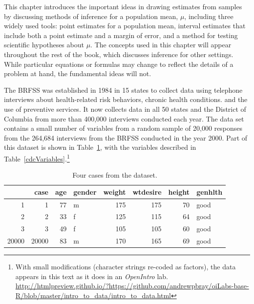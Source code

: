 This chapter introduces the important ideas in drawing estimates from samples by discussing methods of inference for a population mean, $\mu$, including three widely used tools: point estimates for a population mean, interval estimates that include both a point estimate and a margin of error, and a method for testing scientific hypotheses about $\mu$. The concepts used in this chapter will appear throughout the rest of the book, which discusses inference for other settings. While particular equations or formulas may change to reflect the details of a problem at hand, the fundamental ideas will not. 



The BRFSS was established in 1984 in 15 states to collect data using telephone interviews about health-related risk behaviors, chronic health conditions. and the use of preventive services.  It now collects data in all 50 states and the District of Columbia from more than 400,000 interviews conducted each year.  The data set  contains a small number of variables from a random sample of 20,000 responses from the 264,684 interviews from the BRFSS conducted in the year 2000.  Part of this dataset is shown in Table~\ref{cdcDF}, with the variables described in Table~\ref{cdcVariables}.\footnote{With small modifications (character strings re-coded as factors), the data appears in this text as it does in an \textit{OpenIntro} lab. \url{http://htmlpreview.github.io/?https://github.com/andrewpbray/oiLabs-base-R/blob/master/intro\_to\_data/intro\_to\_data.html} }



\begin{table}[ht]
\centering
\begin{tabular}{rrrlrrrl}
  \hline
 & case & age & gender & weight & wtdesire & height & genhlth \\ 
  \hline
1 &   1 &  77 & m & 175 & 175 &  70 & good \\ 
  2 &   2 &  33 & f & 125 & 115 &  64 & good \\ 
  3 &   3 &  49 & f & 105 & 105 &  60 & good \\ 
  20000 & 20000 &  83 & m & 170 & 165 &  69 & good \\ 
   \hline
\end{tabular}
\caption{Four cases from the  dataset.}
\label{cdcDF}
\end{table}


